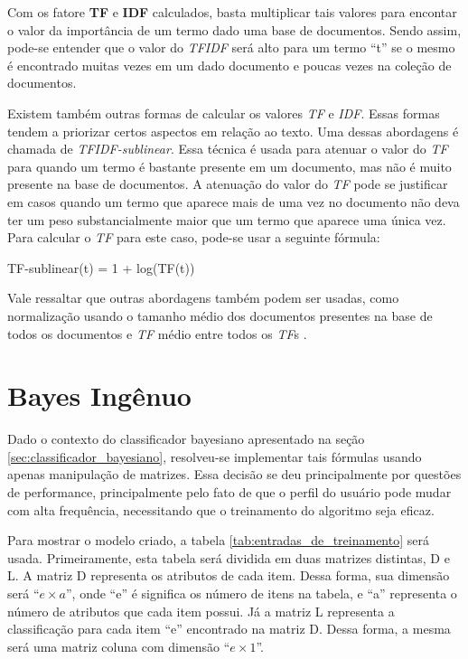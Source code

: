 \begin{anexosenv}
Com os fatore \textbf{TF} e \textbf{IDF} calculados, basta multiplicar tais
valores para encontar o valor da importância de um termo dado uma base de
documentos. Sendo assim, pode-se entender que o valor do \textit{TFIDF} será
alto para um termo ``t'' se o mesmo é encontrado muitas vezes em um dado
documento e poucas vezes na coleção de documentos.

Existem também outras formas de calcular os valores \textit{TF} e \textit{IDF}.
Essas formas tendem a priorizar certos aspectos em relação ao texto. Uma dessas
abordagens é chamada de \textit{TFIDF-sublinear}. Essa técnica é usada para
atenuar o valor do \textit{TF} para quando um termo é bastante presente em um
documento, mas não é muito presente na base de documentos. A atenuação do valor
do \textit{TF} pode se justificar em casos quando um termo que aparece mais de
uma vez no documento não deva ter um peso substancialmente maior que um termo
que aparece uma única vez. Para calcular o \textit{TF} para este caso, pode-se
usar a seguinte fórmula:

TF-sublinear(t) = 1 + log(TF(t))

Vale ressaltar que outras abordagens também podem ser usadas, como normalização
usando o tamanho médio dos documentos presentes na base de todos os documentos e
\textit{TF} médio entre todos os \textit{TF}s \cite{araujo2011apprecommender}.


\chapter{Bayes Ingênuo}

Dado o contexto do classificador bayesiano apresentado na seção
\ref{sec:classificador_bayesiano}, resolveu-se implementar tais fórmulas usando
apenas manipulação de matrizes. Essa decisão se deu principalmente por questões
de performance, principalmente pelo fato de que o perfil do usuário pode mudar
com alta frequência, necessitando que o treinamento do algoritmo seja eficaz.

Para mostrar o modelo criado, a tabela \ref{tab:entradas_de_treinamento} será
usada. Primeiramente, esta tabela será dividida em duas matrizes distintas, D e
L. A matriz D representa os atributos de cada item. Dessa forma, sua dimensão
será ``${e \times a}$'', onde ``e'' é significa os número de itens na tabela, e
``a'' representa o número de atributos que cada item possui. Já a matriz L
representa a classificação para cada item ``e'' encontrado na matriz D. Dessa
forma, a mesma será uma matriz coluna com dimensão ``${e \times 1}$''.


\end{anexosenv}

